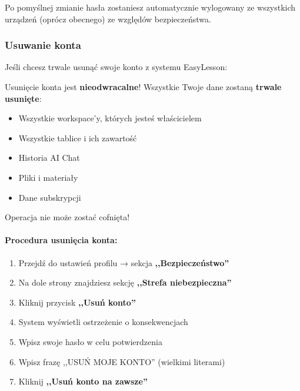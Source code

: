 \documentclass[12pt,a4paper]{article}
\begin{document}
Po pomyślnej zmianie hasła zostaniesz automatycznie wylogowany ze wszystkich urządzeń (oprócz obecnego) ze względów bezpieczeństwa.

\subsubsection{Usuwanie konta}

Jeśli chcesz trwale usunąć swoje konto z systemu EasyLesson:

\begin{tcolorbox}[colback=red!10!white,colframe=red!75!black,title=\faExclamationTriangle\ OSTRZEŻENIE]
Usunięcie konta jest \textbf{nieodwracalne}! Wszystkie Twoje dane zostaną \textbf{trwale usunięte}:
\begin{itemize}
    \item Wszystkie workspace'y, których jesteś właścicielem
    \item Wszystkie tablice i ich zawartość
    \item Historia AI Chat
    \item Pliki i materiały
    \item Dane subskrypcji
\end{itemize}
Operacja nie może zostać cofnięta!
\end{tcolorbox}

\paragraph{Procedura usunięcia konta:}

\begin{enumerate}
    \item Przejdź do ustawień profilu → sekcja \textbf{,,Bezpieczeństwo''}
    \item Na dole strony znajdziesz sekcję \textbf{,,Strefa niebezpieczna''}
    \item Kliknij przycisk \textbf{,,Usuń konto''}
    \item System wyświetli ostrzeżenie o konsekwencjach
    \item Wpisz swoje hasło w celu potwierdzenia
    \item Wpisz frazę ,,USUŃ MOJE KONTO'' (wielkimi literami)
    \item Kliknij \textbf{,,Usuń konto na zawsze''}
\end{enumerate}

\end{document}
